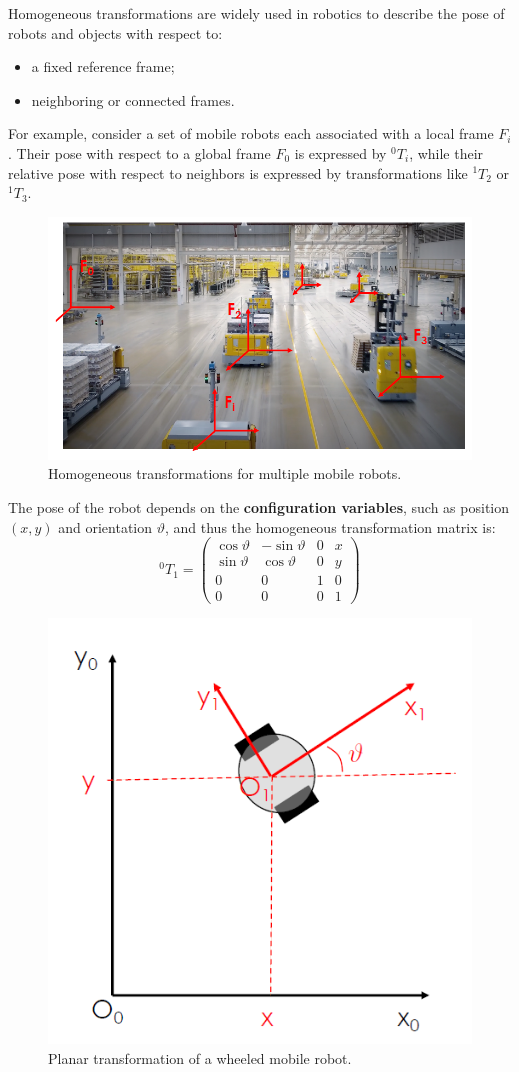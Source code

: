 Homogeneous transformations are widely used in robotics to describe the pose of robots and objects with respect to:
\begin{itemize}
  \item a fixed reference frame;
  \item neighboring or connected frames.
\end{itemize}

For example, consider a set of mobile robots each associated with a local frame $F_i$. Their pose with respect to a global frame $F_0$ is expressed by ${}^0T_i$, while their relative pose with respect to neighbors is expressed by transformations like ${}^1T_2$ or ${}^1T_3$.

\begin{figure}[H]
  \centering
  \includegraphics[width=0.75\linewidth]{imgs/homogeneous_robots_scene.png}
  \caption{Homogeneous transformations for multiple mobile robots.}
\end{figure}

The pose of the robot depends on the \textbf{configuration variables}, such as position $(x, y)$ and orientation $\vartheta$, and thus the homogeneous transformation matrix is:
\[
{}^0T_1 = \begin{pmatrix}
\cos\vartheta & -\sin\vartheta & 0 & x \\
\sin\vartheta & \cos\vartheta  & 0 & y \\
0 & 0 & 1 & 0 \\
0 & 0 & 0 & 1
\end{pmatrix}
\]

\begin{figure}[H]
  \centering
  \includegraphics[width=0.45\linewidth]{imgs/homogeneous_planar_robot.png}
  \caption{Planar transformation of a wheeled mobile robot.}
\end{figure}

